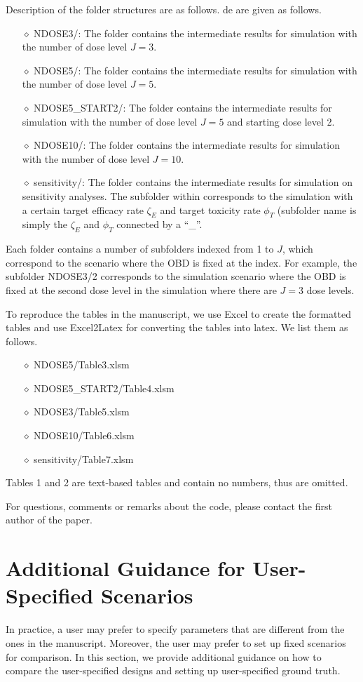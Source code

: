 \documentclass[notitlepage]{article}
\begin{document}
Description of the folder structures are as follows.
de are given as follows.
\begin{itemize}
\item[$\diamond$] NDOSE3/: The folder contains the intermediate results for simulation with the number of dose level $J=3$.
\item[$\diamond$] NDOSE5/: The folder contains the intermediate results for simulation with the number of dose level $J=5$.
\item[$\diamond$] NDOSE5\_START2/: The folder contains the intermediate results for simulation with the number of dose level $J=5$ and starting dose level 2.
\item[$\diamond$] NDOSE10/: The folder contains the intermediate results for simulation with the number of dose level $J=10$.
\item[$\diamond$] sensitivity/: The folder contains the intermediate results for simulation on sensitivity analyses. The subfolder within corresponds to the simulation with a certain target efficacy rate $\zeta_E$ and target toxicity rate $\phi_T$ (subfolder name is simply the $\zeta_E$ and $\phi_T$ connected by a ``\_''.
\end{itemize}
Each folder contains a number of subfolders indexed from 1 to $J$, which correspond to the scenario where the OBD is fixed at the index. For example, the subfolder NDOSE3/2 corresponds to the simulation scenario where the OBD is fixed at the second dose level in the simulation where there are $J=3$ dose levels.


To reproduce the tables in the manuscript, we use Excel to create the formatted tables and use Excel2Latex for converting the tables into latex. We list them as follows.
\begin{itemize}
\item[$\diamond$] NDOSE5/Table3.xlsm
\item[$\diamond$] NDOSE5\_START2/Table4.xlsm
\item[$\diamond$] NDOSE3/Table5.xlsm
\item[$\diamond$] NDOSE10/Table6.xlsm
\item[$\diamond$] sensitivity/Table7.xlsm
\end{itemize}
Tables 1 and 2 are text-based tables and contain no numbers, thus are omitted.

For questions, comments or remarks about the code, please contact the first author of the paper.

\section{Additional Guidance for User-Specified Scenarios}
 In practice, a user may prefer to specify parameters that are different from the ones in the manuscript. Moreover, the user may prefer to set up fixed scenarios for comparison.
 In this section, we provide additional guidance on how to compare the user-specified designs and setting up user-specified ground truth.
\end{document}
